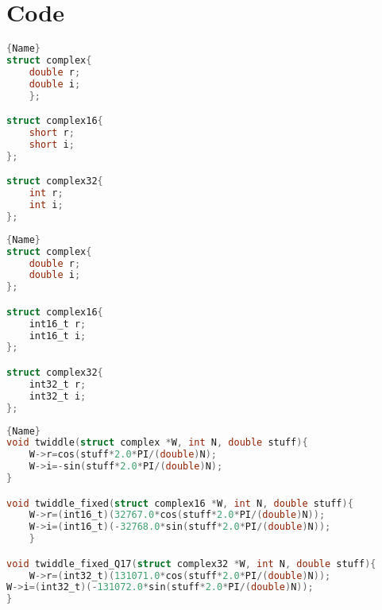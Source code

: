 \documentclass[a4paper]{article}
\begin{document}
\section{Code}
\noindent\begin{minipage}{.45\textwidth}
\begin{lstlisting}[caption=complex.h - original,label={CODE:CMXO},frame=tlrb, language=C]{Name}
struct complex{
    double r;
    double i;
    };

struct complex16{
    short r;
    short i;
};

struct complex32{
    int r;
    int i;
};
    \end{lstlisting}
\end{minipage}\hfill
\begin{minipage}{.45\textwidth}
    \begin{lstlisting}[caption=complex.h - modified, label={CODE:CMXM}, frame=tlrb, language=C]{Name}
struct complex{
    double r;
    double i;
};

struct complex16{
    int16_t r;
    int16_t i;
};

struct complex32{
    int32_t r;
    int32_t i;
};
    \end{lstlisting}
\end{minipage}
\newpage
\begin{lstlisting}[caption=fft.c - twiddle factors, label={CODE:TWID},frame=tlrb, language=C]{Name}
void twiddle(struct complex *W, int N, double stuff){
    W->r=cos(stuff*2.0*PI/(double)N);
    W->i=-sin(stuff*2.0*PI/(double)N);
}

void twiddle_fixed(struct complex16 *W, int N, double stuff){
    W->r=(int16_t)(32767.0*cos(stuff*2.0*PI/(double)N));
    W->i=(int16_t)(-32768.0*sin(stuff*2.0*PI/(double)N));
    }

void twiddle_fixed_Q17(struct complex32 *W, int N, double stuff){
    W->r=(int32_t)(131071.0*cos(stuff*2.0*PI/(double)N));
W->i=(int32_t)(-131072.0*sin(stuff*2.0*PI/(double)N));
}
\end{lstlisting}
\end{document}
